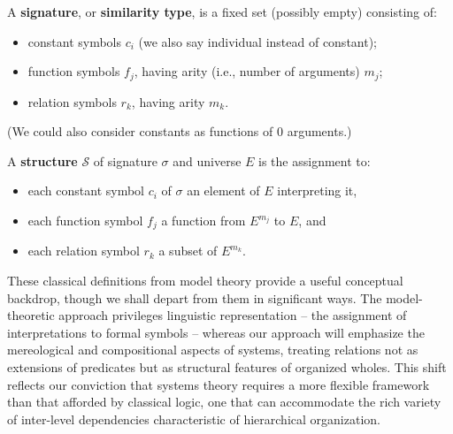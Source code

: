 A \textbf{signature}, or \textbf{similarity type}, is a fixed set (possibly empty) consisting of:
\begin{itemize}
    \item constant symbols $c_i$ (we also say individual instead of constant);
    \item function symbols $f_j$, having arity (i.e., number of arguments) $m_j$;
    \item relation symbols $r_k$, having arity $m_k$.
\end{itemize}

(We could also consider constants as functions of 0 arguments.)

A \textbf{structure} $\mathcal{S}$ of signature $\sigma$ and universe $E$ is the assignment to:
\begin{itemize}
    \item each constant symbol $c_i$ of $\sigma$ an element of $E$ interpreting it,
    \item each function symbol $f_j$ a function from $E^{m_j}$ to $E$, and
    \item each relation symbol $r_k$ a subset of $E^{m_k}$.
\end{itemize}

These classical definitions from model theory provide a useful conceptual backdrop, though we shall depart from them in significant ways. The model-theoretic approach privileges linguistic representation -- the assignment of interpretations to formal symbols -- whereas our approach will emphasize the mereological and compositional aspects of systems, treating relations not as extensions of predicates but as structural features of organized wholes. This shift reflects our conviction that systems theory requires a more flexible framework than that afforded by classical logic, one that can accommodate the rich variety of inter-level dependencies characteristic of hierarchical organization.
